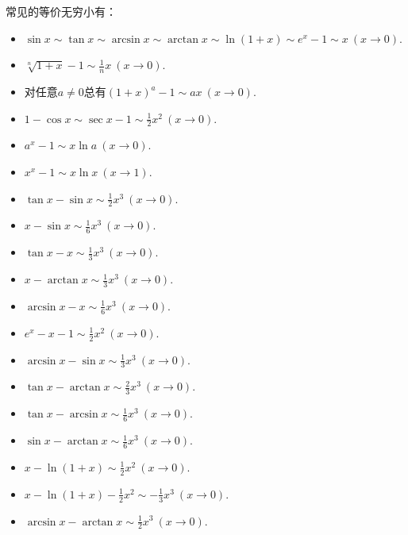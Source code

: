 常见的等价无穷小有：
\begin{itemize}
	\item \(\sin x%
		\sim \tan x%
		\sim \arcsin x%
		\sim \arctan x%
		\sim \ln(1+x)%
		\sim e^x-1%
		\sim x\ (x\to0)\).
	\item \(\sqrt[n]{1+x} - 1 \sim \frac1n x\ (x\to0)\).
	\item 对任意\(a\neq0\)总有\((1+x)^a-1 \sim ax\ (x\to0)\).%
	\item \(1-\cos x%
		\sim \sec x-1%
		\sim \frac12 x^2\ (x\to0)\).
	\item \(a^x-1 \sim x \ln a\ (x\to0)\).%
	\item \(x^x-1 \sim x \ln x\ (x\to1)\).%
	\item \(\tan x - \sin x \sim \frac12 x^3\ (x\to0)\).
	\item \(x - \sin x \sim \frac16 x^3\ (x\to0)\).
	\item \(\tan x - x \sim \frac13 x^3\ (x\to0)\).
	\item \(x - \arctan x \sim \frac13 x^3\ (x\to0)\).
	\item \(\arcsin x - x \sim \frac16 x^3\ (x\to0)\).
	\item \(e^x - x - 1 \sim \frac12 x^2\ (x\to0)\).
	\item \(\arcsin x - \sin x \sim \frac13 x^3\ (x\to0)\).
	\item \(\tan x - \arctan x \sim \frac23 x^3\ (x\to0)\).
	\item \(\tan x - \arcsin x \sim \frac16 x^3\ (x\to0)\).
	\item \(\sin x - \arctan x \sim \frac16 x^3\ (x\to0)\).
	\item \(x - \ln(1+x) \sim \frac12 x^2\ (x\to0)\).
	\item \(x - \ln(1+x) - \frac12 x^2 \sim -\frac13 x^3\ (x\to0)\).
	\item \(\arcsin x - \arctan x \sim \frac12 x^3\ (x\to0)\).
\end{itemize}

